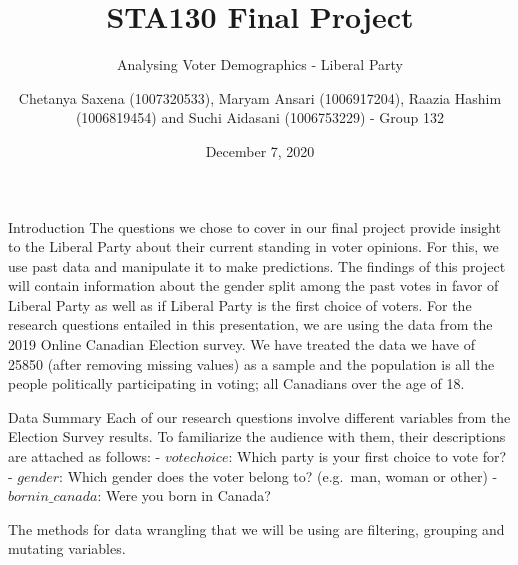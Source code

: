 \documentclass[
  9pt,
  ignorenonframetext,
]{beamer}
\title{STA130 Final Project}
\subtitle{Analysing Voter Demographics - Liberal Party}
\author{Chetanya Saxena (1007320533), Maryam Ansari (1006917204), Raazia
Hashim (1006819454) and Suchi Aidasani (1006753229) - Group 132}
\date{December 7, 2020}
\begin{document}
\frame{\titlepage}

\begin{frame}{Introduction}
\protect\hypertarget{introduction}{}
The questions we chose to cover in our final project provide insight to
the Liberal Party about their current standing in voter opinions. For
this, we use past data and manipulate it to make predictions. The
findings of this project will contain information about the gender split
among the past votes in favor of Liberal Party as well as if Liberal
Party is the first choice of voters. For the research questions entailed
in this presentation, we are using the data from the 2019 Online
Canadian Election survey. We have treated the data we have of 25850
(after removing missing values) as a sample and the population is all
the people politically participating in voting; all Canadians over the
age of 18.

\begin{block}{Data Summary}
\protect\hypertarget{data-summary}{}
Each of our research questions involve different variables from the
Election Survey results. To familiarize the audience with them, their
descriptions are attached as follows: - \(votechoice\): Which party is
your first choice to vote for? - \(gender\): Which gender does the voter
belong to? (e.g.~man, woman or other) - \(bornin\_canada\): Were you
born in Canada?

The methods for data wrangling that we will be using are filtering,
grouping and mutating variables.
\end{block}
\end{frame}
\end{document}
